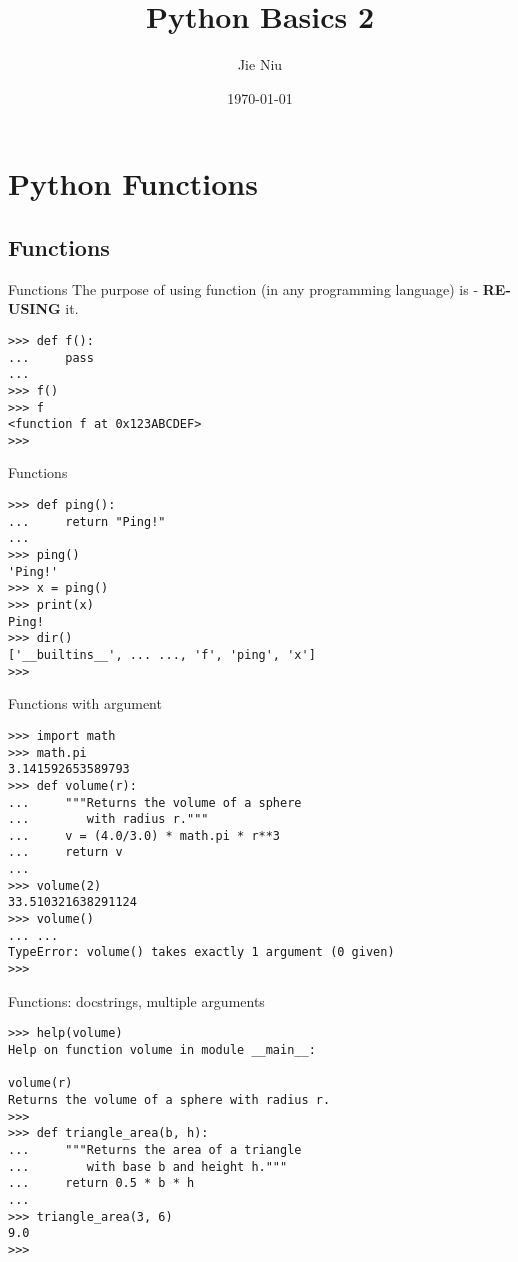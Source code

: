 \documentclass{beamer}
\title{Python Basics 2}
\author{Jie Niu}
\institute{IGWES, JNU}
\date{\today}
\begin{document}
\begin{frame}
\titlepage
\end{frame}

\section{Python Functions}
\subsection{Functions}

\begin{frame}[fragile]{Functions}
The purpose of using function (in any programming language) is - \textbf{RE-USING} it.\\
\begin{verbatim}
>>> def f():
...     pass
...
>>> f()
>>> f
<function f at 0x123ABCDEF>
>>>
\end{verbatim}
\end{frame}

\begin{frame}[fragile]{Functions}
\begin{verbatim}
>>> def ping():
...     return "Ping!"
...
>>> ping()
'Ping!'
>>> x = ping()
>>> print(x)
Ping!
>>> dir()
['__builtins__', ... ..., 'f', 'ping', 'x']
>>>
\end{verbatim}
\end{frame}

\begin{frame}[fragile]{Functions with argument}
\begin{verbatim}
>>> import math
>>> math.pi
3.141592653589793
>>> def volume(r):
...     """Returns the volume of a sphere 
...        with radius r."""
...     v = (4.0/3.0) * math.pi * r**3
...     return v
...
>>> volume(2)
33.510321638291124
>>> volume()
... ...
TypeError: volume() takes exactly 1 argument (0 given)
>>>
\end{verbatim}
\end{frame}

\begin{frame}[fragile]{Functions: docstrings, multiple arguments}
\begin{verbatim}
>>> help(volume)
Help on function volume in module __main__:

volume(r)
Returns the volume of a sphere with radius r.
>>>
>>> def triangle_area(b, h):
...     """Returns the area of a triangle
...        with base b and height h."""
...     return 0.5 * b * h
...
>>> triangle_area(3, 6)
9.0
>>>
\end{verbatim}
\end{frame}
\end{document}
